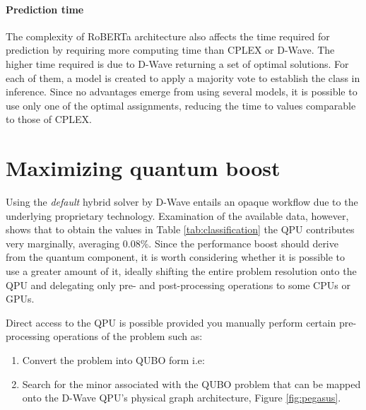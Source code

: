 \documentclass{ceurart}
\begin{document}
\paragraph{Prediction time} The complexity of RoBERTa architecture also affects the time required for prediction by requiring more computing time than CPLEX or D-Wave. The higher time required is due to D-Wave returning a set of optimal solutions. For each of them, a model is created to apply a majority vote to establish the class in inference. Since no advantages emerge from using several models, it is possible to use only one of the optimal assignments, reducing the time to values comparable to those of CPLEX.

\section{Maximizing quantum boost}

Using the \emph{default} hybrid solver by D-Wave entails an opaque workflow due to the underlying proprietary technology. Examination of the available data, however, shows that to obtain the values in Table \ref{tab:classification} the QPU contributes very marginally, averaging 0.08\%. Since the performance boost should derive from the quantum component, it is worth considering whether it is possible to use a greater amount of it, ideally shifting the entire problem resolution onto the QPU and delegating only pre- and post-processing operations to some CPUs or GPUs.

Direct access to the QPU is possible provided you manually perform certain pre-processing operations of the problem such as:
\begin{enumerate}
    \item Convert the problem into QUBO form i.e:
    \item Search for the minor\cite{ME}\cite{MEdwave} associated with the QUBO problem that can be mapped onto the D-Wave QPU's physical graph architecture, Figure \ref{fig:pegasus}.
\end{enumerate}
\end{document}
